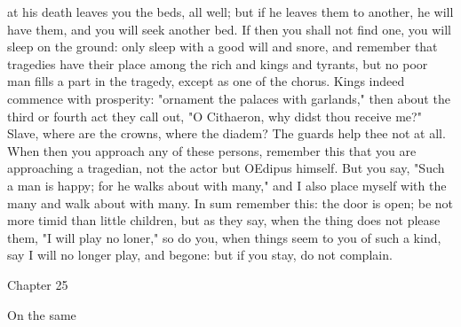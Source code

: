 \documentclass[a4paper]{article}
\begin{document}
at his death leaves you the beds, all well; but if he leaves them to another,
he will have them, and you will seek another bed. If then you shall not find
one, you will sleep on the ground: only sleep with a good will and snore, and
remember that tragedies have their place among the rich and kings and tyrants,
but no poor man fills a part in the tragedy, except as one of the chorus. Kings
indeed commence with prosperity: "ornament the palaces with garlands," then
about the third or fourth act they call out, "O Cithaeron, why didst thou
receive me?" Slave, where are the crowns, where the diadem? The guards help
thee not at all. When then you approach any of these persons, remember this
that you are approaching a tragedian, not the actor but OEdipus himself. But
you say, "Such a man is happy; for he walks about with many," and I also place
myself with the many and walk about with many. In sum remember this: the door
is open; be not more timid than little children, but as they say, when the
thing does not please them, "I will play no loner," so do you, when things seem
to you of such a kind, say I will no longer play, and begone: but if you stay,
do not complain.

Chapter 25

On the same
\end{document}
